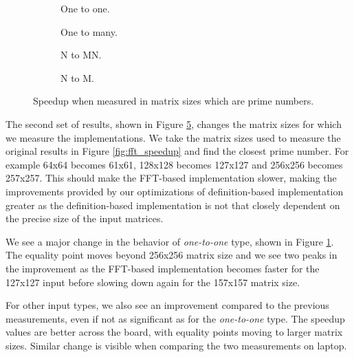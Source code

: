 \begin{figure}[ht]
	\centering	
	\begin{subfigure}{0.4\textwidth}
		\centering
		\def\svgwidth{\textwidth}
		
		\caption{One to one.}
		\label{fig:fft_speedup_antifft_one_to_one}
	\end{subfigure}
	\begin{subfigure}{0.4\textwidth}
		\centering
		\def\svgwidth{\textwidth}
		
		\caption{One to many.}
		\label{fig:fft_speedup_antifft_one_to_many}
	\end{subfigure}
	\begin{subfigure}{0.4\textwidth}
		\centering
		\def\svgwidth{\textwidth}
		
		\caption{N to MN.}
		\label{fig:fft_speedup_antifft_n_to_mn}
	\end{subfigure}
	\begin{subfigure}{0.4\textwidth}
		\centering
		\def\svgwidth{\textwidth}
		
		\caption{N to M.}
		\label{fig:fft_speedup_antifft_n_to_m}
	\end{subfigure}
	\caption{Speedup when measured in matrix sizes which are prime numbers.}
	\label{fig:fft_speedup_antifft}
\end{figure}

The second set of results, shown in Figure \ref{fig:fft_speedup_antifft}, changes the matrix sizes for which we measure the implementations. We take the matrix sizes used to measure the original results in Figure \ref{fig:fft_speedup} and find the closest prime number. For example 64x64 becomes 61x61, 128x128 becomes 127x127 and 256x256 becomes 257x257. This should make the FFT-based implementation slower, making the improvements provided by our optimizations of definition-based implementation greater as the definition-based implementation is not that closely dependent on the precise size of the input matrices.

We see a major change in the behavior of \textit{one-to-one} type, shown in Figure \ref{fig:fft_speedup_antifft_one_to_one}. The equality point moves beyond 256x256 matrix size and we see two peaks in the improvement as the FFT-based implementation becomes faster for the 127x127 input before slowing down again for the 157x157 matrix size. 

For other input types, we also see an improvement compared to the previous measurements, even if not as significant as for the \textit{one-to-one} type. The speedup values are better across the board, with equality points moving to larger matrix sizes. Similar change is visible when comparing the two measurements on laptop.


